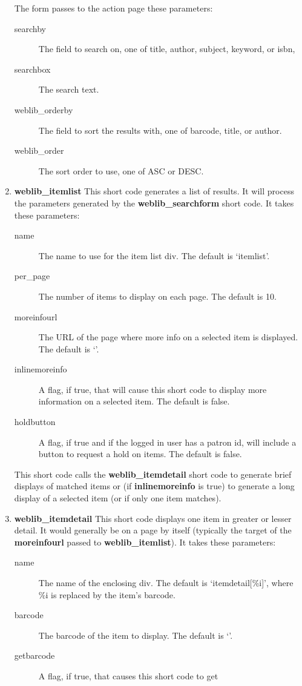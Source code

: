 \documentclass[letterpaper,twoside]{article}
\begin{document}
\begin{enumerate}
The form passes to the action page these parameters:
\begin{description}
\item[searchby] The field to search on, one of title, author, subject,
keyword, or isbn,
\item[searchbox] The search text.
\item[weblib\_orderby] The field to sort the results with, one of
barcode, title, or author.
\item[weblib\_order] The sort order to use, one of ASC or DESC.
\end{description}
\item \textbf{weblib\_itemlist} This short code generates a list of
results. It will process the parameters generated by the
\textbf{weblib\_searchform} short code.  It takes these parameters:
  \begin{description}
  \item[name] The name to use for the item list div. The default is `itemlist'.
  \item[per\_page] The number of items to display on each page. The
default is 10.
  \item[moreinfourl] The URL of the page where more info on a selected
item is displayed. The default is `'. 
  \item[inlinemoreinfo] A flag, if true, that will cause this short code
to display more information on a selected item. The default is false.
  \item[holdbutton] A flag, if true and if the logged in user has a
patron id, will include a button to request a hold on items. The
default is false.
  \end{description}
This short code calls the \textbf{weblib\_itemdetail} short code to
generate brief displays of matched items or (if \textbf{inlinemoreinfo}
is true) to generate a long display of a selected item (or if only one
item matches). 
\item \textbf{weblib\_itemdetail} This short code displays one item in
greater or lesser detail. It would generally be on a page by itself
(typically the target of the \textbf{moreinfourl} passed to
\textbf{weblib\_itemlist}). It takes these parameters:
  \begin{description}
  \item[name] The name of the enclosing div.  The default is
`itemdetail[\%i]', where \%i is replaced by the item's barcode.
  \item[barcode] The barcode of the item to display. The default is `'.
  \item[getbarcode] A flag, if true, that causes this short code to get

\end{description}
\end{enumerate}
\end{document}
